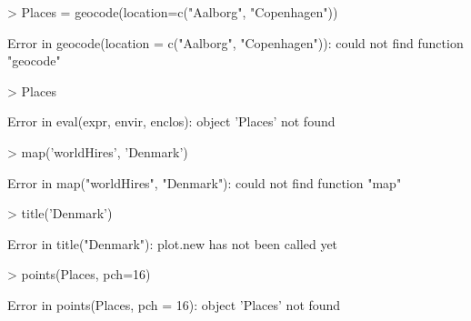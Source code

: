 \begin{Schunk}
\begin{Sinput}
> Places = geocode(location=c("Aalborg", "Copenhagen")) 
\end{Sinput}
\begin{Soutput}
Error in geocode(location = c("Aalborg", "Copenhagen")): could not find function "geocode"
\end{Soutput}
\begin{Sinput}
> Places 
\end{Sinput}
\begin{Soutput}
Error in eval(expr, envir, enclos): object 'Places' not found
\end{Soutput}
\begin{Sinput}
> map('worldHires', 'Denmark') 
\end{Sinput}
\begin{Soutput}
Error in map("worldHires", "Denmark"): could not find function "map"
\end{Soutput}
\begin{Sinput}
> title('Denmark') 
\end{Sinput}
\begin{Soutput}
Error in title("Denmark"): plot.new has not been called yet
\end{Soutput}
\begin{Sinput}
> points(Places, pch=16) 
\end{Sinput}
\begin{Soutput}
Error in points(Places, pch = 16): object 'Places' not found
\end{Soutput}
\end{Schunk}



